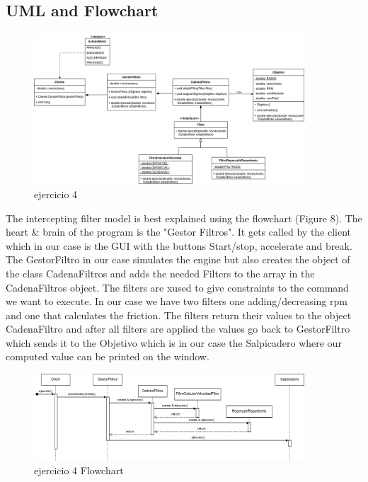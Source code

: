 \documentclass{article}
\begin{document}
\subsection{UML and Flowchart}
\begin{figure}[H]
	\centering
        \vspace{15pt}
	\includegraphics[width=0.9\textwidth]{Ej4.png}
	\caption{ejercicio 4}
	\label{fig:ej4}
\end{figure}

\item The intercepting filter model is best explained using the flowchart (Figure 8). The heart & brain of the program is the "Gestor Filtros". It gets called by the client which in our case is the GUI with the buttons Start/stop, accelerate and break. The GestorFiltro in our case simulates the engine but also creates the object of the class CadenaFiltros and adds the needed Filters to the array in the CadenaFiltros object. The filters are xused to give constraints to the command we want to execute. In our case we have two filters one adding/decreasing rpm and one that calculates the friction. The filters return their values to the object CadenaFiltro and after all filters are applied the values go back to GestorFiltro which sends it to the Objetivo which is in our case the Salpicadero where our computed value can be printed on the window.

\begin{figure}[H]
	\centering
        \vspace{15pt}
	\includegraphics[width=0.9\textwidth]{Flow_EJ4.png}
	\caption{ejercicio 4 Flowchart}
	\label{fig:ej4}
\end{figure}
\end{document}

